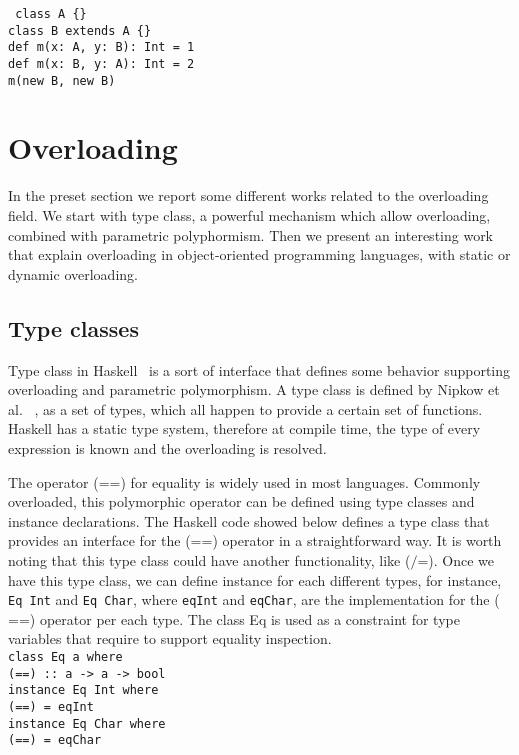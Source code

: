 \documentclass[hidelinks, twocolumn]{article}
\begin{document}
\texttt{
class A \{\} \\
class B extends A \{\} \\
def m(x: A, y: B): Int = 1\\
def m(x: B, y: A): Int = 2\\
m(new B, new B)\\ }
\section{Overloading}\label{section:polymorphism}
In the preset section we report some different works related to the overloading field. We start with type class, a powerful mechanism which allow overloading, combined with parametric polyphormism. Then we present an interesting work that explain overloading in object-oriented programming languages, with static or dynamic overloading.
\subsection{Type classes}
Type class in Haskell~\cite{wadlerBlott:popl89} is a sort of interface that defines some behavior supporting overloading and parametric polymorphism. A type class is defined by Nipkow et al.~\cite{Nipkow1993}	, as a set of types, which all happen to provide a certain set of functions. Haskell has a static type system, therefore at compile time, the type of every expression is known and the overloading  is resolved. 

The operator ($\texttt{==}$) for equality is widely used in most languages. Commonly overloaded, this polymorphic operator can be defined using type classes and instance declarations. The Haskell code showed below defines a type class that provides an interface for the ($\texttt{==}$) operator in a straightforward way. It is worth noting that this type class could have another functionality, like ($\texttt{/=}$). Once we have this type class, we can define instance for each different types, for instance,  \texttt{Eq Int} and \texttt{Eq Char}, where \texttt{eqInt} and \texttt{eqChar}, are the implementation for the ($\texttt{==}$) operator per each type. The class Eq is used as a constraint for  type variables  that require to support equality inspection.\\

\texttt{class Eq a where\\
(==) :: a -> a -> bool\\
instance Eq Int where\\
(==) = eqInt\\
instance Eq Char where\\
(==) = eqChar \\}
\end{document}
